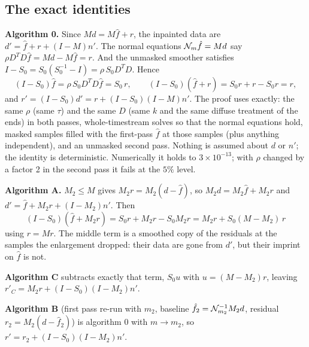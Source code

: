 \documentclass{article}
\numberwithin{equation}{section}   %
\begin{document}
\subsection{The exact identities}
\label{sec:ip_identity}

{\bf Algorithm 0.}  Since $Md = M\hat f + r$, the inpainted data are $d' = \hat f + r + (I - M)n'$.  The
normal equations ${\cal N}_m \hat f = Md$ say $\rho D^TD \hat f = Md - M\hat f = r$.  And the unmasked
smoother satisfies $I - S_0 = S_0(S_0^{-1} - I) = \rho\, S_0 D^TD$.  Hence
\begin{equation}
(I - S_0)\hat f = \rho\, S_0 D^TD \hat f = S_0\, r, \qquad
(I - S_0)(\hat f + r) = S_0 r + r - S_0 r = r ,
\end{equation}
and $r' = (I - S_0)d' = r + (I - S_0)(I - M)n'$.  The proof uses exactly: the same $\rho$ (same $\tau$) and
the same $D$ (same $k$ and the same diffuse treatment of the ends) in both passes, whole-timestream
solves so that the normal equations hold, masked samples filled with the first-pass $\hat f$ at those
samples (plus anything independent), and an unmasked second pass.  Nothing is assumed about $d$ or $n'$;
the identity is deterministic.  Numerically it holds to $3 \times 10^{-13}$; with $\rho$ changed by a
factor 2 in the second pass it fails at the $5\%$ level.

{\bf Algorithm A.}  $M_2 \le M$ gives $M_2 r = M_2(d - \hat f)$, so $M_2 d = M_2 \hat f + M_2 r$ and
$d' = \hat f + M_2 r + (I - M_2)n'$.  Then
\begin{equation}
(I - S_0)(\hat f + M_2 r) = S_0 r + M_2 r - S_0 M_2 r = M_2 r + S_0 (M - M_2)\, r
\end{equation}
using $r = Mr$.  The middle term is a smoothed copy of the residuals at the samples the enlargement
dropped: their data are gone from $d'$, but their imprint on $\hat f$ is not.

{\bf Algorithm C} subtracts exactly that term, $S_0 u$ with $u = (M - M_2)r$, leaving
$r'_C = M_2 r + (I - S_0)(I - M_2)n'$.

{\bf Algorithm B} (first pass re-run with $m_2$, baseline $\hat f_2 = {\cal N}_{m_2}^{-1}M_2 d$, residual
$r_2 = M_2(d - \hat f_2)$) is algorithm 0 with $m \rightarrow m_2$, so $r' = r_2 + (I - S_0)(I - M_2)n'$.
\end{document}
